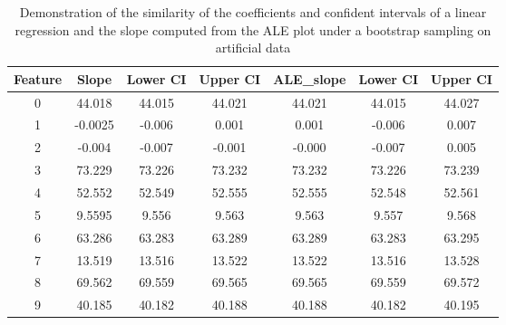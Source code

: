 \begin{table}[h]
\centering
{}
\begin{tabular}{|c||c|c|c||c|c|c|}
\hline
Feature & Slope & Lower CI & Upper CI & ALE\_slope & Lower CI & Upper CI \\
\hline
0 &44.018 &44.015 & 44.021 & 44.021 & 44.015 & 44.027 \\
1 &-0.0025 &-0.006 & 0.001 & 0.001 & -0.006 & 0.007 \\
2 &-0.004 &-0.007 & -0.001 & -0.000 & -0.007 & 0.005 \\
3 &73.229 &73.226 & 73.232 & 73.232 & 73.226 & 73.239 \\
4 &52.552 &52.549 & 52.555 & 52.555 & 52.548 & 52.561 \\
5 &9.5595 &9.556 & 9.563 & 9.563 & 9.557 & 9.568 \\
6 &63.286 &63.283 & 63.289 & 63.289 & 63.283 & 63.295 \\
7 &13.519 &13.516 & 13.522 & 13.522 & 13.516 & 13.528 \\
8 &69.562 &69.559 & 69.565 & 69.565 & 69.559 & 69.572 \\
9 &40.185 &40.182 & 40.188 & 40.188 & 40.182 & 40.195 \\
\hline
\end{tabular}

\caption{Demonstration of the similarity of the coefficients and confident intervals of a linear regression and the slope computed from the ALE plot under a bootstrap sampling on artificial data}
\label{table:linear_regression_ci}
\end{table}

